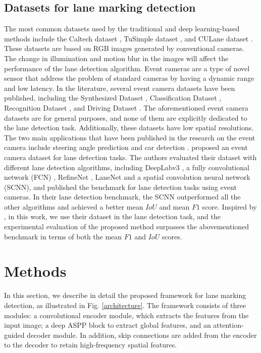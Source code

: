 \documentclass[journal]{IEEEtran}
\begin{document}
\subsection{Datasets for lane marking detection}
The most common datasets used by the traditional and deep learning-based methods include the Caltech dataset \cite{Aly2008}, TuSimple dataset \cite{tusimple}, and CULane dataset \cite{Pan2017}. These datasets are based on RGB images generated by conventional cameras. The change in illumination and motion blur in the images will affect the performance of the lane detection algorithm. Event cameras are a type of novel sensor that address the problem of standard cameras by having a dynamic range and low latency. In the literature, several event camera datasets have been published, including the Synthesized Dataset \cite{Mueggler2017}, Classification Dataset \cite{Li2017}, Recognition Dataset \cite{Hu2016}, and Driving Dataset \cite{Binas2017}. The aforementioned event camera datasets are for general purposes, and none of them are explicitly dedicated to the lane detection task. Additionally, these datasets have low spatial resolutions. The two main applications that have been published in the research on the event camera include steering angle prediction \cite{24} and car detection \cite{Chen2018}. \cite{Cheng2019} proposed an event camera dataset for lane detection tasks. The authors evaluated their dataset with different lane detection algorithms, including DeepLabv3 \cite{a4}, a fully convolutional network (FCN) \cite{Long2015}, RefineNet \cite{Lin2017}, LaneNet \cite{Wang2018} and a spatial convolution neural network (SCNN)\cite{Pan2017}, and published the benchmark for lane detection tasks using event cameras. In their lane detection benchmark, the SCNN \cite{Pan2017} outperformed all the other algorithms and achieved a better mean $IoU$ and mean $F1$ score. Inspired by \cite{Cheng2019}, in this work, we use their dataset in the lane detection task, and the experimental evaluation of the proposed method surpasses the abovementioned benchmark in terms of both the mean $F1$ and $IoU$ scores.


\section{Methods}
In this section, we describe in detail the proposed framework for lane marking detection, as illustrated in Fig. \ref{architecture}. The framework consists of three modules: a convolutional encoder module, which extracts the features from the input image; a deep ASPP block to extract global features, and an attention-guided decoder module. In addition, skip connections are added from the encoder to the decoder to retain high-frequency spatial features.
\end{document}
